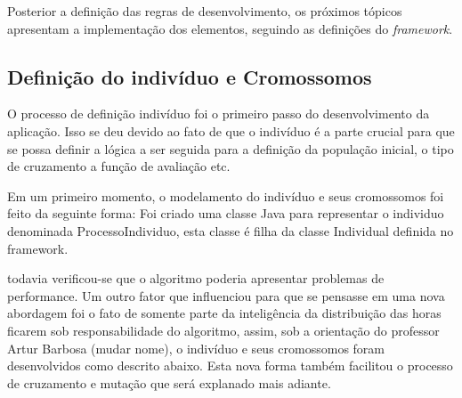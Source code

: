 \par Posterior a definição das regras de desenvolvimento, os próximos tópicos apresentam a implementação 
dos elementos, seguindo as definições do \textit{framework}.

\subsection{Definição do indivíduo e Cromossomos}
\par O processo de definição indivíduo foi o primeiro passo do desenvolvimento da aplicação. Isso 
se deu devido ao fato de que o indivíduo é a parte crucial para que se possa definir a lógica a ser seguida para
a definição da população inicial, o tipo de cruzamento a função de avaliação etc.


\par Em um primeiro momento, o modelamento do indivíduo e seus cromossomos foi feito da seguinte forma:
Foi criado uma classe Java para representar o individuo denominada ProcessoIndividuo, esta classe é filha 
da classe Individual definida no framework.


todavia verificou-se que o algoritmo poderia apresentar problemas de performance. Um outro fator que 
influenciou para que se pensasse em uma nova abordagem foi o fato de somente parte da inteligência da distribuição
das horas ficarem sob responsabilidade do algoritmo, assim, sob a orientação do professor Artur Barbosa (mudar nome), 
o indivíduo e seus cromossomos foram desenvolvidos como descrito abaixo. Esta nova forma também facilitou o processo 
de cruzamento e mutação que será explanado mais adiante.




	  
	
	
	
